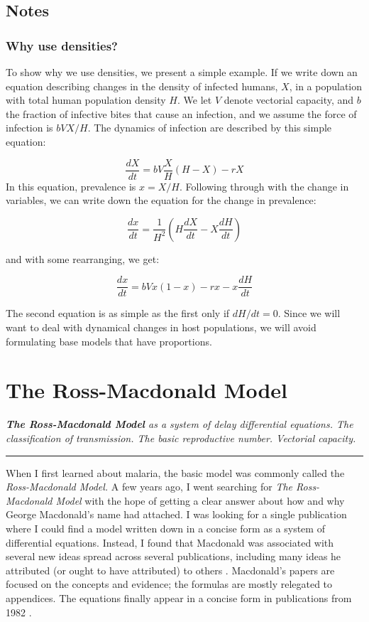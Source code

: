 \documentclass[
]{book}
\begin{document}
\section{Notes}\label{notes}

\subsection{Why use densities?}\label{why-use-densities}

To show why we use densities, we present a simple example. If we write down an equation describing changes in the density of infected humans, \(X\), in a population with total human population density \(H\). We let \(V\) denote vectorial capacity, and \(b\) the fraction of infective bites that cause an infection, and we assume the force of infection is \(bVX/H\). The dynamics of infection are described by this simple equation:

\[\frac{dX}{dt} = bV\frac{X}{H}(H-X)-rX\]
In this equation, prevalence is \(x = X/H.\) Following through with the change in variables, we can write down the equation for the change in prevalence:

\[\frac{dx}{dt} = \frac{1}{H^2} \left(H \frac{dX}{dt} - X \frac{dH}{dt} \right)\]

and with some rearranging, we get:

\[\frac{dx}{dt} = bVx(1-x)-rx -x \frac{dH}{dt}\]

The second equation is as simple as the first only if \(dH/dt=0\). Since we will want to deal with dynamical changes in host populations, we will avoid formulating base models that have proportions.

\chapter{The Ross-Macdonald Model}\label{the-ross-macdonald-model}

\emph{\textbf{The Ross-Macdonald Model} as a system of delay differential equations. The classification of transmission. The basic reproductive number. Vectorial capacity.}

\begin{center}\rule{0.5\linewidth}{0.5pt}\end{center}

When I first learned about malaria, the basic model was commonly called the \emph{Ross-Macdonald Model.}
A few years ago, I went searching for \emph{The Ross-Macdonald Model} with the hope of getting a clear answer about how and why George Macdonald's name had attached.
I was looking for a single publication where I could find a model written down in a concise form as a system of differential equations.
Instead, I found that Macdonald was associated with several new ideas spread across several publications, including many ideas he attributed (or ought to have attributed) to others \autocite{SmithDL2012_RossMacdonald}.
Macdonald's papers are focused on the concepts and evidence; the formulas are mostly relegated to appendices.
The equations finally appear in a concise form in publications from 1982 \autocite{AronJL1982PopulationDynamics,BaileyNTJ1982BiomathematicsMalaria}.
\end{document}
